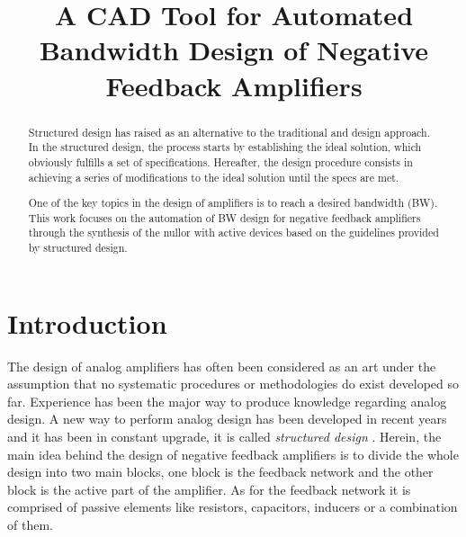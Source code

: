 \documentclass[conference]{IEEEtran}
\begin{document}
\title{A CAD Tool for Automated Bandwidth Design of Negative Feedback Amplifiers}

\author{
}


\maketitle

\begin{abstract}
Structured design has raised as an alternative to the traditional and design approach. In the structured design, the process starts by establishing the ideal solution, which obviously fulfills a set of specifications. Hereafter, the design procedure consists in achieving a series of modifications to the ideal solution until the specs are met.

One of the key topics in the design of amplifiers is to reach a desired bandwidth (BW). This work focuses on the automation of BW design for negative feedback amplifiers through the synthesis of the nullor with active devices based on the guidelines provided by structured design.
\end{abstract}

\section{Introduction}
The design of analog amplifiers has often been considered as an art under the assumption that no systematic procedures or methodologies do exist developed so far. Experience has been the major way to produce knowledge regarding analog design. A new way to perform analog design has been developed in recent years and it has been in constant upgrade, it is called {\it structured design} \cite{verhoeven}. Herein, the main idea behind the design of negative feedback amplifiers is to divide the whole design into two main blocks, one block is the feedback network and the other block is the active part of the amplifier. As for the feedback network it is comprised of passive elements like resistors, capacitors, inducers or a combination of them.
\end{document}
